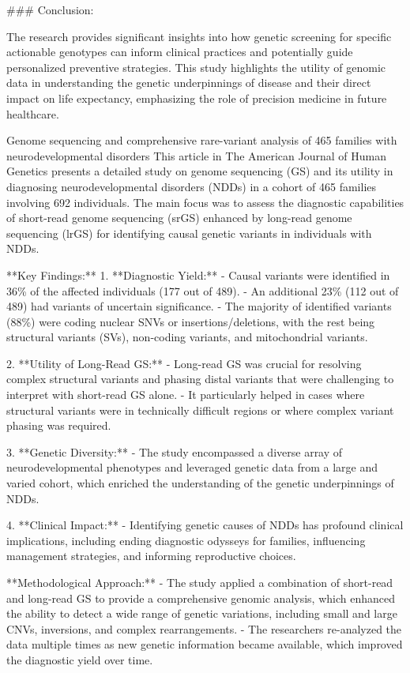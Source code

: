 ### Conclusion:

The research provides significant insights into how genetic screening for specific actionable genotypes can inform clinical practices and potentially guide personalized preventive strategies. This study highlights the utility of genomic data in understanding the genetic underpinnings of disease and their direct impact on life expectancy, emphasizing the role of precision medicine in future healthcare.

\citep{sanchis2023genome}
Genome sequencing and comprehensive rare-variant analysis of 465 families with neurodevelopmental disorders
This article in The American Journal of Human Genetics presents a detailed study on genome sequencing (GS) and its utility in diagnosing neurodevelopmental disorders (NDDs) in a cohort of 465 families involving 692 individuals. The main focus was to assess the diagnostic capabilities of short-read genome sequencing (srGS) enhanced by long-read genome sequencing (lrGS) for identifying causal genetic variants in individuals with NDDs.

**Key Findings:**
1. **Diagnostic Yield:**
   - Causal variants were identified in 36\% of the affected individuals (177 out of 489).
   - An additional 23\% (112 out of 489) had variants of uncertain significance.
   - The majority of identified variants (88\%) were coding nuclear SNVs or insertions/deletions, with the rest being structural variants (SVs), non-coding variants, and mitochondrial variants.

2. **Utility of Long-Read GS:**
   - Long-read GS was crucial for resolving complex structural variants and phasing distal variants that were challenging to interpret with short-read GS alone.
   - It particularly helped in cases where structural variants were in technically difficult regions or where complex variant phasing was required.

3. **Genetic Diversity:**
   - The study encompassed a diverse array of neurodevelopmental phenotypes and leveraged genetic data from a large and varied cohort, which enriched the understanding of the genetic underpinnings of NDDs.

4. **Clinical Impact:**
   - Identifying genetic causes of NDDs has profound clinical implications, including ending diagnostic odysseys for families, influencing management strategies, and informing reproductive choices.

**Methodological Approach:**
- The study applied a combination of short-read and long-read GS to provide a comprehensive genomic analysis, which enhanced the ability to detect a wide range of genetic variations, including small and large CNVs, inversions, and complex rearrangements.
- The researchers re-analyzed the data multiple times as new genetic information became available, which improved the diagnostic yield over time.


